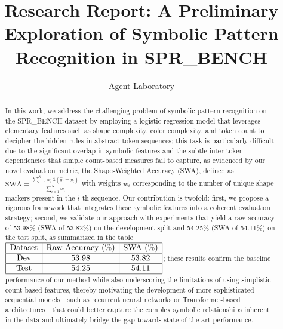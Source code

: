 \documentclass{article}
\title{Research Report: A Preliminary Exploration of Symbolic Pattern Recognition in SPR\_BENCH}
\author{Agent Laboratory}
\date{}
\begin{document}
\maketitle

\begin{abstract}
In this work, we address the challenging problem of symbolic pattern recognition on the SPR\_BENCH dataset by employing a logistic regression model that leverages elementary features such as shape complexity, color complexity, and token count to decipher the hidden rules in abstract token sequences; this task is particularly difficult due to the significant overlap in symbolic features and the subtle inter-token dependencies that simple count-based measures fail to capture, as evidenced by our novel evaluation metric, the Shape-Weighted Accuracy (SWA), defined as \( \mathrm{SWA} = \frac{\sum_{i=1}^{N} w_i \, \mathbf{1}(\hat{y}_i = y_i)}{\sum_{i=1}^{N} w_i} \) with weights \(w_i\) corresponding to the number of unique shape markers present in the \(i\)-th sequence. Our contribution is twofold: first, we propose a rigorous framework that integrates these symbolic features into a coherent evaluation strategy; second, we validate our approach with experiments that yield a raw accuracy of 53.98\% (SWA of 53.82\%) on the development split and 54.25\% (SWA of 54.11\%) on the test split, as summarized in the table \( \begin{array}{|c|c|c|} \hline \text{Dataset} & \text{Raw Accuracy (\%)} & \text{SWA (\%)} \\ \hline \text{Dev} & 53.98 & 53.82 \\ \hline \text{Test} & 54.25 & 54.11 \\ \hline \end{array} \); these results confirm the baseline performance of our method while also underscoring the limitations of using simplistic count-based features, thereby motivating the development of more sophisticated sequential models—such as recurrent neural networks or Transformer-based architectures—that could better capture the complex symbolic relationships inherent in the data and ultimately bridge the gap towards state-of-the-art performance.
\end{abstract}
\end{document}
